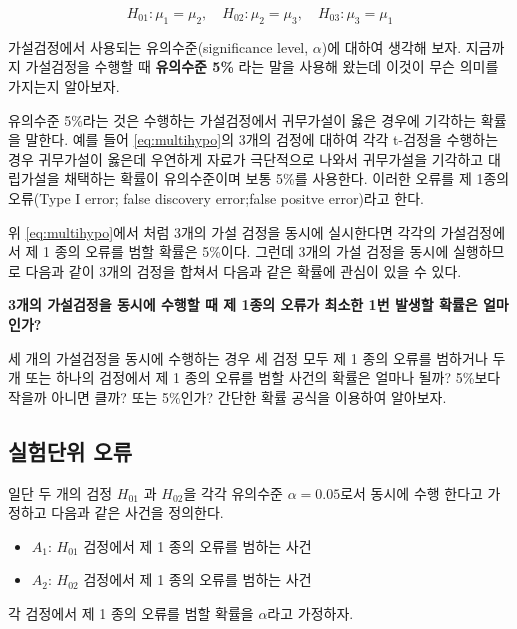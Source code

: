 \documentclass[
  10pt,
]{book}
\providecommand{\tightlist}{%
  \setlength{\itemsep}{0pt}\setlength{\parskip}{0pt}}
\theoremstyle{definition}
\theoremstyle{definition}
\theoremstyle{definition}
\theoremstyle{definition}
\theoremstyle{remark}
\begin{document}
\begin{equation}
H_{01}: \mu_1 = \mu_2, \quad H_{02}: \mu_2 = \mu_3, \quad H_{03}: \mu_3 =\mu_1 
\label{eq:multihypo}
\end{equation}

가설검정에서 사용되는 유의수준(significance level, \(\alpha\))에 대하여
생각해 보자. 지금까지 가설검정을 수행할 때 \textbf{유의수준 5\%} 라는 말을
사용해 왔는데 이것이 무슨 의미를 가지는지 알아보자.

유의수준 5\%라는 것은 수행하는 가설검정에서 귀무가설이 옳은 경우에
기각하는 확률을 말한다. 예를 들어 \eqref{eq:multihypo}의 3개의 검정에
대하여 각각 t-검정을 수행하는 경우 귀무가설이 옳은데 우연하게 자료가
극단적으로 나와서 귀무가설을 기각하고 대립가설을 채택하는 확률이
유의수준이며 보통 5\%를 사용한다. 이러한 오류를 제 1종의 오류(Type I
error; false discovery error;false positve error)라고 한다.

위 \eqref{eq:multihypo}에서 처럼 3개의 가설 검정을 동시에 실시한다면
각각의 가설검정에서 제 1 종의 오류를 범할 확률은 5\%이다. 그런데 3개의
가설 검정을 동시에 실행하므로 다음과 같이 3개의 검정을 합쳐서 다음과
같은 확률에 관심이 있을 수 있다.

\textbf{3개의 가설검정을 동시에 수행할 때 제 1종의 오류가 최소한 1번 발생할
확률은 얼마인가?}

세 개의 가설검정을 동시에 수행하는 경우 세 검정 모두 제 1 종의 오류를
범하거나 두 개 또는 하나의 검정에서 제 1 종의 오류를 범할 사건의 확률은
얼마나 될까? 5\%보다 작을까 아니면 클까? 또는 5\%인가? 간단한 확률 공식을
이용하여 알아보자.

\hypertarget{uxc2e4uxd5d8uxb2e8uxc704-uxc624uxb958}{%
\subsection{실험단위 오류}\label{uxc2e4uxd5d8uxb2e8uxc704-uxc624uxb958}}

일단 두 개의 검정 \(H_{01}\) 과 \(H_{02}\)을 각각 유의수준 \(\alpha=0.05\)로서
동시에 수행 한다고 가정하고 다음과 같은 사건을 정의한다.

\begin{itemize}
\tightlist
\item
  \(A_1\): \(H_{01}\) 검정에서 제 1 종의 오류를 범하는 사건
\item
  \(A_2\): \(H_{02}\) 검정에서 제 1 종의 오류를 범하는 사건
\end{itemize}

각 검정에서 제 1 종의 오류를 범할 확률을 \(\alpha\)라고 가정하자.
\end{document}
